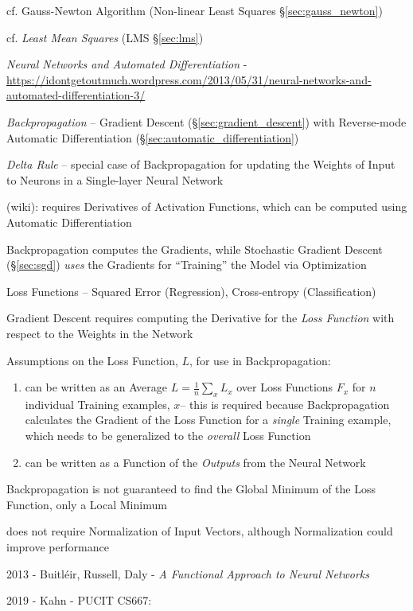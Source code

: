 cf. Gauss-Newton Algorithm (Non-linear Least Squares \S\ref{sec:gauss_newton})

cf. \emph{Least Mean Squares} (LMS \S\ref{sec:lms})

\emph{Neural Networks and Automated Differentiation} -
\url{https://idontgetoutmuch.wordpress.com/2013/05/31/neural-networks-and-automated-differentiation-3/}

\emph{Backpropagation} -- Gradient Descent (\S\ref{sec:gradient_descent}) with
Reverse-mode Automatic Differentiation (\S\ref{sec:automatic_differentiation})

\emph{Delta Rule} -- special case of Backpropagation for updating the Weights of
Input to Neurons in a Single-layer Neural Network

(wiki): requires Derivatives of Activation Functions, which can be computed
using Automatic Differentiation

Backpropagation computes the Gradients, while Stochastic Gradient Descent
(\S\ref{sec:sgd}) \emph{uses} the Gradients for ``Training'' the Model via
Optimization

Loss Functions -- Squared Error (Regression), Cross-entropy (Classification)

Gradient Descent requires computing the Derivative for the \emph{Loss Function}
with respect to the Weights in the Network

Assumptions on the Loss Function, $L$, for use in Backpropagation:
\begin{enumerate}
  \item can be written as an Average $L = \frac{1}{n} \sum_x L_x$ over Loss
    Functions $F_x$ for $n$ individual Training examples, $x$-- this is required
    because Backpropagation calculates the Gradient of the Loss Function for a
    \emph{single} Training example, which needs to be generalized to the
    \emph{overall} Loss Function
  \item can be written as a Function of the \emph{Outputs} from the Neural
    Network
\end{enumerate}

Backpropagation is not guaranteed to find the Global Minimum of the Loss
Function, only a Local Minimum

does not require Normalization of Input Vectors, although Normalization could
improve performance

2013 - Buitl\'eir, Russell, Daly -
\emph{A Functional Approach to Neural Networks}

2019 - Kahn - PUCIT CS667:

